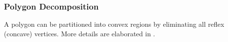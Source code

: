 \subsubsection{Polygon Decomposition}
A polygon can be partitioned into convex regions by eliminating all reflex (concave) vertices. More details are elaborated in  \cite{YogeshETES2014} \cite{YogeshIJCAET2017}.
%
%
%
%
%
%
%
